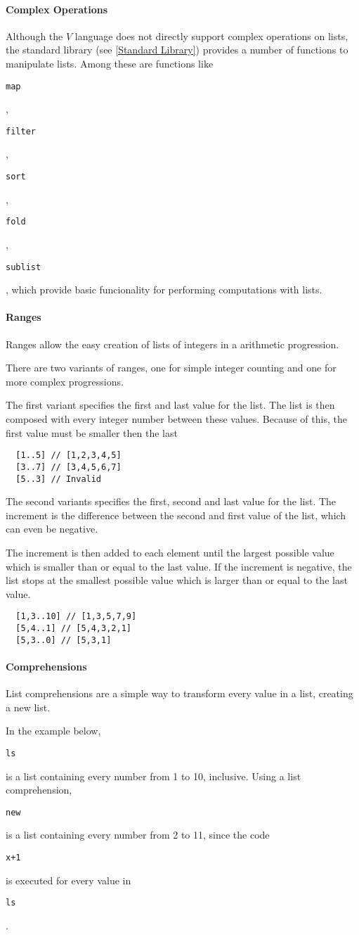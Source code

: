 \documentclass{article}
\def\code#1{\begin{footnotesize}\texttt{#1}\end{footnotesize}}
\begin{document}
\paragraph{Complex Operations}
Although the $V$ language does not directly support complex operations on lists, the standard library (see \ref{Standard Library}) provides a number of functions to manipulate lists.
Among these are functions like \code{map}, \code{filter}, \code{sort}, \code{fold}, \code{sublist}, which provide basic funcionality for performing computations with lists.

\paragraph{Ranges}
Ranges allow the easy creation of lists of integers in a arithmetic progression.

There are two variants of ranges, one for simple integer counting and one for more complex progressions.

The first variant specifies the first and last value for the list.
The list is then composed with every integer number between these values.
Because of this, the first value must be smaller then the last

\begin{lstlisting}
  [1..5] // [1,2,3,4,5]
  [3..7] // [3,4,5,6,7]
  [5..3] // Invalid
\end{lstlisting}

The second variants specifies the first, second and last value for the list.
The increment is the difference between the second and first value of the list, which can even be negative.

The increment is then added to each element until the largest possible value which is smaller than or equal to the last value.
If the increment is negative, the list stops at the smallest possible value which is larger than or equal to the last value.

\begin{lstlisting}
  [1,3..10] // [1,3,5,7,9]
  [5,4..1] // [5,4,3,2,1]
  [5,3..0] // [5,3,1]
\end{lstlisting}

\paragraph{Comprehensions}
List comprehensions are a simple way to transform every value in a list, creating a new list.

In the example below, \code{ls} is a list containing every number from 1 to 10, inclusive.
Using a list comprehension, \code{new} is a list containing every number from 2 to 11, since the code \code{x+1} is executed for every value in \code{ls}.
\end{document}
